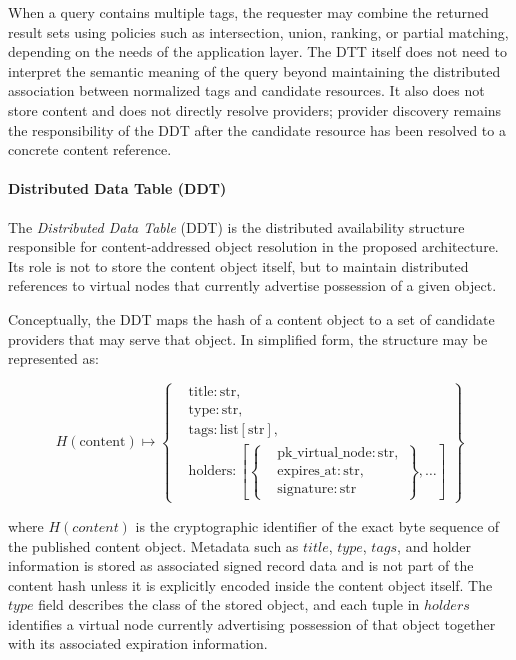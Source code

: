 \documentclass[12pt,a4paper]{article}
\begin{document}
When a query contains multiple tags, the requester may combine the returned result sets using policies such as intersection, union, ranking, or partial matching, depending on the needs of the application layer. The DTT itself does not need to interpret the semantic meaning of the query beyond maintaining the distributed association between normalized tags and candidate resources. It also does not store content and does not directly resolve providers; provider discovery remains the responsibility of the DDT after the candidate resource has been resolved to a concrete content reference.

\paragraph{Distributed Data Table (DDT)}

The \textit{Distributed Data Table} (DDT) is the distributed availability structure responsible for content-addressed object resolution in the proposed architecture. Its role is not to store the content object itself, but to maintain distributed references to virtual nodes that currently advertise possession of a given object.

Conceptually, the DDT maps the hash of a content object to a set of candidate providers that may serve that object. In simplified form, the structure may be represented as:

\[
H(\mathrm{content}) \mapsto
\left\{
\begin{aligned}
&\mathrm{title}: \mathrm{str},\\
&\mathrm{type}: \mathrm{str},\\
&\mathrm{tags}: \mathrm{list}[\mathrm{str}],\\
&\mathrm{holders}:
\left[
\left\{
\begin{aligned}
&\mathrm{pk\_virtual\_node}: \mathrm{str},\\
&\mathrm{expires\_at}: \mathrm{str},\\
&\mathrm{signature}: \mathrm{str}
\end{aligned}
\right\},
\ldots
\right]
\end{aligned}
\right\}
\]

where \(H(content)\) is the cryptographic identifier of the exact byte sequence of the published content object. Metadata such as \(title\), \(type\), \(tags\), and holder information is stored as associated signed record data and is not part of the content hash unless it is explicitly encoded inside the content object itself. The \(type\) field describes the class of the stored object, and each tuple in \(holders\) identifies a virtual node currently advertising possession of that object together with its associated expiration information.
\end{document}
